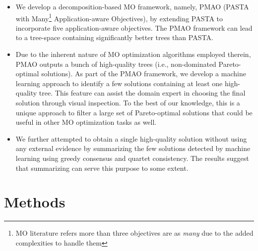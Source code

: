 \documentclass[a4paper,fleqn, review]{cas-dc}
\begin{document}
\begin{itemize}
	\item We develop a decomposition-based MO framework, namely, PMAO (PASTA with Many\footnote{ MO literature refers more than three objectives are as \textit{many}\cite{li2015many} due to the added complexities to handle them} Application-aware Objectives), by extending PASTA to incorporate five application-aware objectives. The PMAO framework can lead to a tree-space containing significantly better trees than PASTA. 
	
	\item Due to the inherent nature of MO optimization algorithms employed therein, PMAO outputs a bunch of high-quality trees (i.e., non-dominated Pareto-optimal solutions). As part of the PMAO framework, we develop a machine learning approach to identify a few solutions containing at least one high-quality tree. This feature can assist the domain expert in choosing the final solution through visual inspection. To the best of our knowledge, this is a unique approach to filter a large set of Pareto-optimal solutions that could be useful in other MO optimization tasks as well. 
	
	\item We further attempted to obtain a single high-quality solution without using any external evidence by summarizing the few solutions detected by machine learning using greedy consensus and quartet consistency. The results suggest that summarizing can serve this purpose to some extent.
	
\end{itemize}


\section{Methods}
\label{sec:method}
\end{document}
